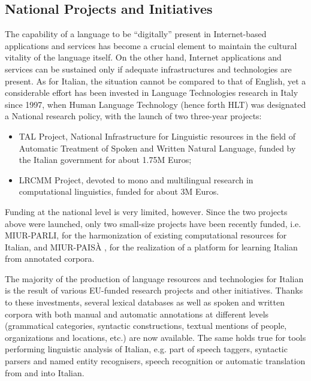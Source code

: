 \documentclass[]{../../metanetpaper}
\begin{document}
\begin{multicols}{2}
\subsection{National Projects and Initiatives}

The capability of a language to be “digitally” present in Internet-based applications and services has become a crucial element to maintain the cultural vitality of the language itself. On the other hand, Internet applications and services can be sustained only if adequate infrastructures and technologies are present. As for Italian, the situation cannot be compared to that of English, yet a considerable effort has been invested in Language Technologies research in Italy since 1997, when Human Language Technology (hence forth HLT) was designated a National research policy, with the launch of two three-year projects:


\begin{itemize}
\item TAL Project, National Infrastructure for Linguistic resources in the field of Automatic Treatment of Spoken and Written Natural Language, funded by the Italian government for about 1.75M Euros;
\item LRCMM Project, devoted to mono and multilingual research in computational linguistics, funded for about 3M Euros.
\end{itemize}


Funding at the national level is very limited, however. Since the two projects above were launched, only two small-size projects have been recently funded, i.e. MIUR-PARLI, for the harmonization of existing computational resources for Italian, and MIUR-PAIS\`{A} , for the realization of a platform for learning Italian from annotated corpora.

The majority of the production of language resources and technologies for Italian is the result of various EU-funded research projects and other initiatives. Thanks to these investments, several lexical databases as well as spoken and written corpora with both manual and automatic annotations at different levels (grammatical categories, syntactic constructions, textual mentions of people, organizations and locations, etc.) are now available. The same holds true for tools performing linguistic analysis of Italian, e.g. part of speech taggers, syntactic parsers and named entity recognisers, speech recognition or automatic translation from and into Italian.


\end{multicols}
\end{document}
